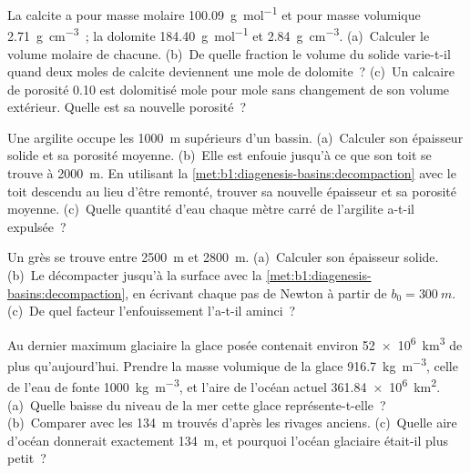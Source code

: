 \begin{exercise}[$\star$]\label{exo:b1:diagenesis-basins:4}
La calcite a pour masse molaire \qty{100.09}{g.mol^{-1}} et pour masse volumique
\qty{2.71}{g.cm^{-3}}~; la dolomite \qty{184.40}{g.mol^{-1}} et
\qty{2.84}{g.cm^{-3}}. (a)~Calculer le volume molaire de chacune. (b)~De quelle
fraction le volume du solide varie-t-il quand deux moles de calcite deviennent
une mole de dolomite~? (c)~Un calcaire de porosité \num{0.10} est dolomitisé
mole pour mole sans changement de son volume extérieur. Quelle est sa nouvelle porosité~?
\end{exercise}

\begin{exercise}[$\star\star$]\label{exo:b1:diagenesis-basins:5}
Une argilite occupe les \qty{1000}{m} supérieurs d'un bassin. (a)~Calculer son épaisseur
solide et sa porosité moyenne. (b)~Elle est enfouie jusqu'à ce que son toit se trouve à
\qty{2000}{m}. En utilisant la \cref{met:b1:diagenesis-basins:decompaction} avec le toit
descendu au lieu d'être remonté, trouver sa nouvelle épaisseur et sa porosité moyenne.
(c)~Quelle quantité d'eau chaque mètre carré de l'argilite a-t-il expulsée~?
\end{exercise}

\begin{exercise}[$\star\star$]\label{exo:b1:diagenesis-basins:6}
Un grès se trouve entre \qty{2500}{m} et \qty{2800}{m}. (a)~Calculer son épaisseur
solide. (b)~Le décompacter jusqu'à la surface avec la
\cref{met:b1:diagenesis-basins:decompaction}, en écrivant chaque pas de Newton
à partir de $b_0 = \qty{300}{m}$. (c)~De quel facteur l'enfouissement l'a-t-il aminci~?
\end{exercise}

\begin{exercise}[$\star\star$]\label{exo:b1:diagenesis-basins:7}
Au dernier maximum glaciaire la glace posée contenait environ \qty{52e6}{km^3} de plus
qu'aujourd'hui. Prendre la masse volumique de la glace \qty{916.7}{kg.m^{-3}}, celle de l'eau de fonte
\qty{1000}{kg.m^{-3}}, et l'aire de l'océan actuel
\qty{361.84e6}{km^2}. (a)~Quelle baisse du niveau de la mer cette glace représente-t-elle~?
(b)~Comparer avec les \qty{134}{m} trouvés d'après les rivages anciens. (c)~Quelle aire d'océan
donnerait exactement \qty{134}{m}, et pourquoi l'océan glaciaire était-il plus petit~?
\end{exercise}

